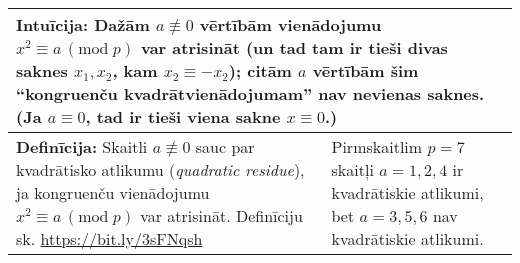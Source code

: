 \documentclass[a4paper]{article}
\begin{document}




\vspace{-10pt}
\renewcommand{\arraystretch}{1.2}
\begin{table}[ht!]\centering
{\small
\begin{tabular*}{18.46cm}{@{}|p{10.35cm}|p{7.25cm}|@{}} \hline
\multicolumn{2}{|p{18.05cm}|}{
\cellcolor[HTML]{E1FFE1}
Intuīcija: Dažām $a\not\equiv 0$ vērtībām vienādojumu $x^2 \equiv a\,(\text{mod}\;p)$ var 
atrisināt (un tad tam ir tieši divas saknes $x_1, x_2$, kam $x_2 \equiv - x_2$); citām $a$ vērtībām
šim ``kongruenču kvadrātvienādojumam'' nav nevienas saknes.\newline 
(Ja $a \equiv 0$, tad ir tieši viena sakne $x \equiv 0$.)
} \\ \hline
{\bf Definīcija:} Skaitli $a\not\equiv 0$ sauc par kvadrātisko atlikumu ({\em quadratic residue}), ja 
kongruenču vienādojumu $x^2 \equiv a\,(\text{mod}\;p)$ var atrisināt.\newline
Definīciju sk. \url{https://bit.ly/3sFNqsh}
 &
Pirmskaitlim $p=7$ skaitļi $a=1,2,4$ ir kvadrātiskie atlikumi, 
bet $a = 3,5,6$ nav kvadrātiskie atlikumi.  \\ \hline
\end{tabular*}
}
\end{table}
\end{document}
